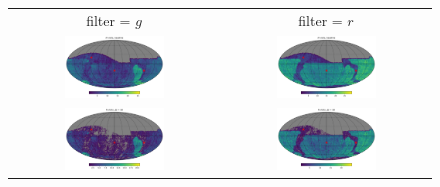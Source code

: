 \documentclass[preprintm,linenumbers]{aastex631}
\begin{document}
\begin{figure}
   		\centering
			\begin{tabular}{c c}
          filter = $g$ &  filter = $r$\\
   		\includegraphics[width=0.5\textwidth]{results/skymaps_cutout/skymaps_cutout_first_year_one_snap_v4_0_10yrs_db_noDD_noTwi_nside-256_CountMetric_g_noDD_noTwi.pdf} &
   		\includegraphics[width=0.5\textwidth]{results/skymaps_cutout/skymaps_cutout_first_year_one_snap_v4_0_10yrs_db_noDD_noTwi_nside-256_CountMetric_r_noDD_noTwi.pdf} \\

         \includegraphics[width=0.5\textwidth]{results/skymaps_cutout/skymaps_cutout_first_year_one_snap_v4_0_10yrs_db_noDD_noTwi_tscale-3_nside-256_doAllTemplateMetrics_reduceCount_g_noDD_noTwi.pdf} &
         \includegraphics[width=0.5\textwidth]{results/skymaps_cutout/skymaps_cutout_first_year_one_snap_v4_0_10yrs_db_noDD_noTwi_tscale-3_nside-256_doAllTemplateMetrics_reduceCount_r_noDD_noTwi.pdf} \\


\end{tabular}
\end{figure}
\end{document}
